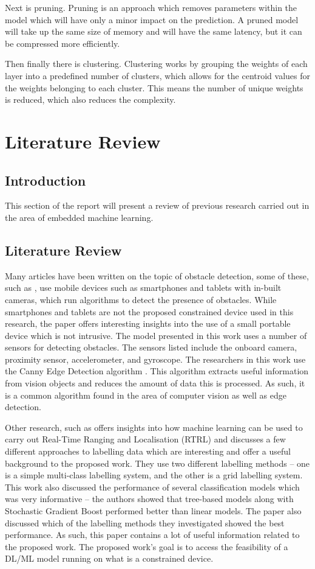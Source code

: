 \documentclass[conference]{IEEEtran}
\begin{document}
Next is pruning. Pruning is an approach which removes parameters within the model which will have only a minor impact on the prediction. A pruned model will take up the same size of memory and will have the same latency, but it can be compressed more efficiently.

Then finally there is clustering. Clustering works by grouping the weights of each layer into a predefined number of clusters, which allows for the centroid values for the weights belonging to each cluster. This means the number of unique weights is reduced, which also reduces the complexity.

\section{Literature Review}
\subsection{Introduction}
This section of the report will present a review of previous research carried out in the area of embedded machine learning.

\subsection{Literature Review}
Many articles have been written on the topic of obstacle detection, some of these, such as \cite{b15}, use mobile devices such as smartphones and tablets with in-built cameras, which run algorithms to detect the presence of obstacles. While smartphones and tablets are not the proposed constrained device used in this research, the paper offers interesting insights into the use of a small portable device which is not intrusive. The model presented in this work uses a number of sensors for detecting obstacles. The sensors listed include the onboard camera, proximity sensor, accelerometer, and gyroscope. The researchers in this work use the Canny Edge Detection algorithm \cite{b16}. This algorithm extracts useful information from vision objects and reduces the amount of data this is processed. As such, it is a common algorithm found in the area of computer vision as well as edge detection.

Other research, such as \cite{b17} offers insights into how machine learning can be used to carry out Real-Time Ranging and Localisation (RTRL) and discusses a few different approaches to labelling data which are interesting and offer a useful background to the proposed work. They use two different labelling methods – one is a simple multi-class labelling system, and the other is a grid labelling system. This work also discussed the performance of several classification models which was very informative – the authors showed that tree-based models along with Stochastic Gradient Boost performed better than linear models. The paper also discussed which of the labelling methods they investigated showed the best performance. As such, this paper contains a lot of useful information related to the proposed work.
The proposed work’s goal is to access the feasibility of a DL/ML model running on what is a constrained device. 
\end{document}
